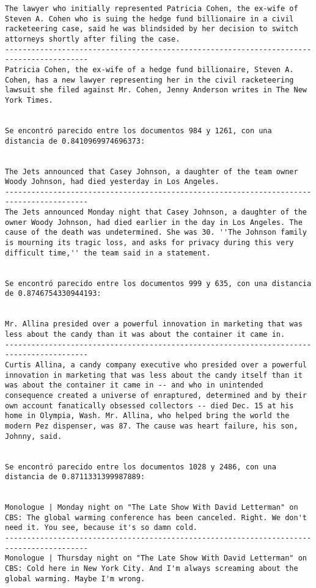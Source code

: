 \documentclass[11pt]{article}
\begin{document}
\begin{Verbatim}[commandchars=\\\{\}]
The lawyer who initially represented Patricia Cohen, the ex-wife of Steven A. Cohen who is suing the hedge fund billionaire in a civil racketeering case, said he was blindsided by her decision to switch attorneys shortly after filing the case.
-----------------------------------------------------------------------------------------
Patricia Cohen, the ex-wife of a hedge fund billionaire, Steven A. Cohen, has a new lawyer representing her in the civil racketeering lawsuit she filed against Mr. Cohen, Jenny Anderson writes in The New York Times.


Se encontró parecido entre los documentos 984 y 1261, con una distancia de 0.8410969974696373:


The Jets announced that Casey Johnson, a daughter of the team owner Woody Johnson, had died yesterday in Los Angeles.
-----------------------------------------------------------------------------------------
The Jets announced Monday night that Casey Johnson, a daughter of the owner Woody Johnson, had died earlier in the day in Los Angeles. The cause of the death was undetermined. She was 30. ''The Johnson family is mourning its tragic loss, and asks for privacy during this very difficult time,'' the team said in a statement.


Se encontró parecido entre los documentos 999 y 635, con una distancia de 0.8746754330944193:


Mr. Allina presided over a powerful innovation in marketing that was less about the candy than it was about the container it came in.
-----------------------------------------------------------------------------------------
Curtis Allina, a candy company executive who presided over a powerful innovation in marketing that was less about the candy itself than it was about the container it came in -- and who in unintended consequence created a universe of enraptured, determined and by their own account fanatically obsessed collectors -- died Dec. 15 at his home in Olympia, Wash. Mr. Allina, who helped bring the world the modern Pez dispenser, was 87. The cause was heart failure, his son, Johnny, said.


Se encontró parecido entre los documentos 1028 y 2486, con una distancia de 0.8711331399987889:


Monologue | Monday night on "The Late Show With David Letterman" on CBS: The global warming conference has been canceled. Right. We don't need it. You see, because it's so damn cold.
-----------------------------------------------------------------------------------------
Monologue | Thursday night on "The Late Show With David Letterman" on CBS: Cold here in New York City. And I'm always screaming about the global warming. Maybe I'm wrong.



\end{Verbatim}
\end{document}
